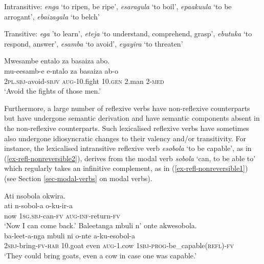 \ea \label{ex-refl-tantum}
\begin{xlist}
\ex \label{ex-refl-tantum1intr}
	Intransitive: \emph{enga} ‘to ripen, be ripe’, \emph{esaragula} `to boil', \emph{epaakuula} `to be arrogant', \emph{ebaizagala} `to belch'

\ex \label{ex-refl-tantum1tr}	
	Transitive: \emph{ega} 'to learn', \emph{eteja} ‘to understand, comprehend, grasp’,  \emph{ebutuka} ‘to respond, answer’, \emph{esamba} `to avoid', \emph{eyayira} `to threaten'

\end{xlist}
\z
	
\ea \label{ex-refl-tantumex}
	\glll Mwesambe            entalo		za	basaiza	abo.\\
		mu-eesamb-e           e-ntalo	za	basaiza	ab-o\\
		2\textsc{pl.sbj}-avoid-\textsc{sbjv}	\textsc{aug}-10.fight	10.\textsc{gen}	2.man 		2-\textsc{med}\\
	\glt ‘Avoid the fights of those men.’
\z

Furthermore, a large number of reflexive verbs have non-reflexive counterparts but have undergone semantic derivation and have semantic components absent in the non-reflexive counterparts. 
Such lexicalised reflexive verbs have sometimes also undergone idiosyncratic changes to their valency and/or transitivity.  
For instance, the lexicalised intransitive reflexive verb \emph{esobola} `to be capable', as in (\ref{ex-refl-nonreversible2}), derives from the modal verb \emph{sobola} `can, to be able to' which regularly takes an infinitive complement, as in (\ref{ex-refl-nonreversible1}) (see Section \ref{sec-modal-verbs} on modal verbs).

\ea \label{ex-refl-nonreversible}
\begin{xlist}
\ex \label{ex-refl-nonreversible1}
	\glll Ati nsobola okwira.	\\
	 	ati 	n-sobol-a o-ku-ir-a\\
		now	\textsc{1sg.sbj}-can-\textsc{fv}	\textsc{aug}-\textsc{inf}-return-\textsc{fv}\\
	\glt 	`Now I can come back.'
\ex \label{ex-refl-nonreversible2}
	\glll	Baleetanga mbuli n' onte akwesobola.\\
	ba-leet-a-nga 		mbuli 	ni	o-nte a-ku-esobol-a\\
		\textsc{2sbj}-bring-\textsc{fv}-\textsc{hab}	10.goat	even	\textsc{aug}-1.cow \textsc{1sbj}-\textsc{prog}-be\_capable(\textsc{refl})-\textsc{fv}\\
	\glt ‘They could bring goats, even a cow in case one was capable.’
\end{xlist}
\z


